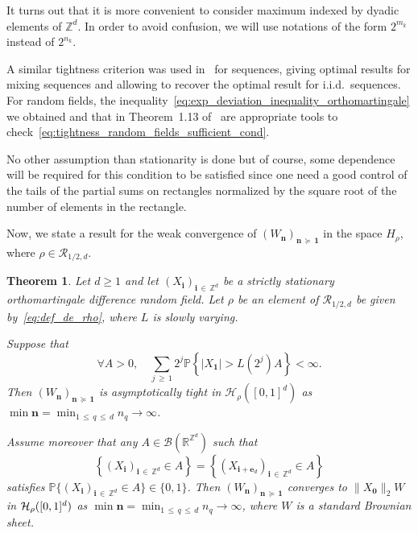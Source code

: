 \documentclass[10pt]{amsart}
\newtheorem{theo}{Theorem}[section]
\theoremstyle{definition}\newtheorem{defi}[theo]{Definition}\newtheorem{rema}[theo]{Remark}\newtheorem{exam}[theo]{Example}\newtheorem{exem}[theo]{Example}\newtheorem{nota}[theo]{Notation}
\newcommand{\Hca}{\mathcal{H}}
\newcommand{\Rca}{\mathcal{R}}
\newcommand{\clB}{\mathcal{B}}
\newcommand\R{\mathbb{R}}
\newcommand\PP{\mathbb{P}}
\newcommand\Z{\mathbb{Z}}
\newcommand\ens[1]{\{ #1\}}
\newcommand{\pr}[1]{(#1)}
\newcommand{\norm}[1]{\lVert #1\rVert}
\newcommand{\gr}[1]{\bm{#1}}
\newcommand{\gri}{\bm{i}}
\newcommand{\grn}{\bm{n}}
\newcommand{\smd}{\succcurlyeq }
\let\oldforall\forall
\renewcommand*{\forall}{\mathrel{\oldforall}}
\begin{document}
It turns out that it is more convenient to consider maximum indexed by dyadic elements of $\Z^d$. In order to avoid confusion, we will use notations of the form $2^{m_k}$ instead of $2^{n_k}$.


A similar tightness criterion was used in~\cite{MR3615086} for sequences, giving optimal results for mixing sequences and allowing to recover the optimal result for i.i.d.\ sequences. For random fields, the inequality~\eqref{eq:exp_deviation_inequality_orthomartingale} we obtained and that in Theorem~1.13 of~\cite{MR4046858} are appropriate tools to check~\eqref{eq:tightness_random_fields_sufficient_cond}.


No other assumption than stationarity is done but of course, some dependence will be required for this condition to be satisfied since one need a good control of the tails of the partial sums on rectangles normalized by the square root of the number of elements in the rectangle.

Now, we state a result for the weak convergence of $\pr{W_{\grn}}_{\grn\,\smd\,\gr{1}}$ in the space $H_\rho$, where $\rho\in\Rca_{1/2,d}$.


\begin{theo}\label{thm:WIP_Holder}
Let $d\geq 1$ and let $\pr{X_{\gri}}_{\gri\,\in\,\Z^d}$ be a strictly stationary orthomartingale difference random field. Let $\rho$ be an element of $\Rca_{1/2,d}$ be given by~\eqref{eq:def_de_rho}, where $L$ is slowly varying.

Suppose that
\begin{equation}\label{eq:cond_suff_WIP}
\forall A>0, \quad\sum_{j\,\geq\,1}2^j\PP\left\{\left|X_{\gr{1}}\right|>L\left(2^j\right)A\right\}<\infty.
\end{equation}
Then $\pr{W_{\grn}}_{\grn\,\smd\,\gr{1}}$ is asymptotically tight in $\Hca_\rho\pr{[0,1]^d}$ as $\min\grn=
\min_{1\,\leq\,q\,\leq\,d}n_q\to\infty$.

Assume moreover that any $A\in\clB\pr{\R^{\Z^d}}$ such that 
\[
\left\{\left(X_{\gri}\right)_{\gri\,\in\,\Z^d}\in A\right\}=\left\{\left(X_{\gri+\gr{e}_d}\right)_{\gri\,\in\,\Z^d}\in A\right\}
\]
satisfies $\PP\ens{\pr{X_{\gri}}_{\gri\,\in\,\Z^d}\in A}\in\ens{0,1}$. Then $\pr{W_{\grn}}_{\grn\,\smd\,\gr{1}}$ converges to $\norm{X_{\gr{0}}}_2 W$ in $\Hca_\rho\linebreak\pr{[0,1]^d}$ as $\min\grn=
\min_{1\,\leq\,q\,\leq\,d}n_q\to\infty$, where $W$ is a standard Brownian sheet.
\end{theo}
\end{document}
